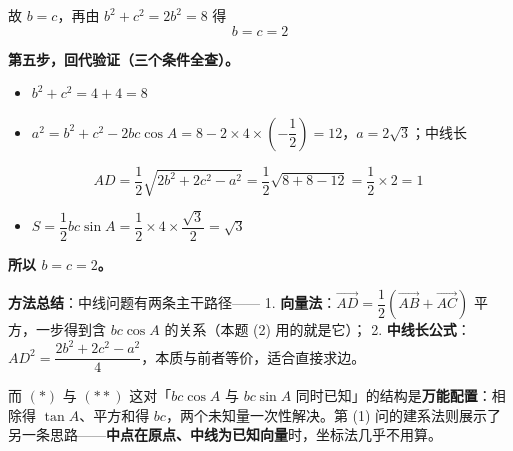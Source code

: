 \begin{answer}
故 $b=c$，再由 $b^{2}+c^{2}=2b^{2}=8$ 得
\nopagebreak[4]
\[b=c=2\]

\textbf{第五步，回代验证（三个条件全查）。}

\begin{itemize}
\item $b^{2}+c^{2}=4+4=8$ 
\item $a^{2}=b^{2}+c^{2}-2bc\cos A=8-2\times4\times\left(-\dfrac12\right)=12$，$a=2\sqrt3$；中线长
\end{itemize}
\nopagebreak[4]
\[AD=\frac12\sqrt{2b^{2}+2c^{2}-a^{2}}=\frac12\sqrt{8+8-12}=\frac12\times2=1\ \]
\begin{itemize}
\item $S=\dfrac12bc\sin A=\dfrac12\times4\times\dfrac{\sqrt3}2=\sqrt3$ 
\end{itemize}

\textbf{所以 $b=c=2$。}

\begin{gktip}
\textbf{方法总结}：中线问题有两条主干路径——
1. \textbf{向量法}：$\overrightarrow{AD}=\dfrac12\left(\overrightarrow{AB}+\overrightarrow{AC}\right)$ 平方，一步得到含 $bc\cos A$ 的关系（本题 (2) 用的就是它）；
2. \textbf{中线长公式}：$AD^{2}=\dfrac{2b^{2}+2c^{2}-a^{2}}4$，本质与前者等价，适合直接求边。

而 $(\ast)$ 与 $(\ast\ast)$ 这对「$bc\cos A$ 与 $bc\sin A$ 同时已知」的结构是\textbf{万能配置}：相除得 $\tan A$、平方和得 $bc$，两个未知量一次性解决。第 (1) 问的建系法则展示了另一条思路——\textbf{中点在原点、中线为已知向量}时，坐标法几乎不用算。
\end{gktip}



\par\medskip

\end{answer}
